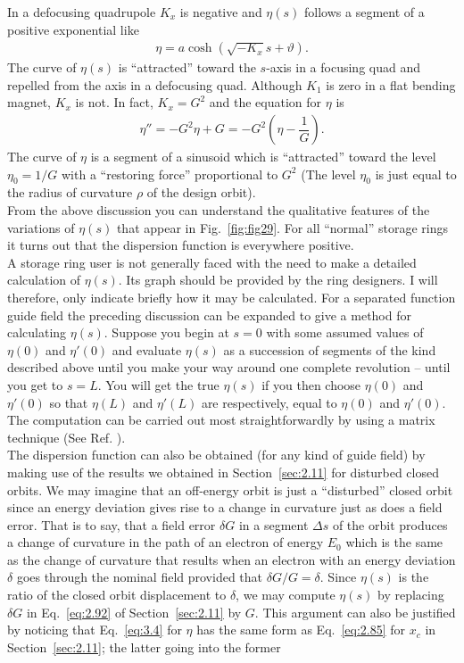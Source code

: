 In a defocusing quadrupole $K_x$ is negative and $\eta(s)$ follows a segment of a positive
exponential like
\begin{align*}
	\eta = a \cosh(\sqrt{-K_x}s+\vartheta).
\end{align*}
The curve of $\eta(s)$ is ``attracted'' toward the $s$-axis in a focusing quad and repelled
from the axis in a defocusing quad.
Although $K_1$ is zero in a flat bending magnet, $K_x$ is not. In fact, $K_x = G^2$ and
the equation for $\eta$ is
\begin{align}
	\eta'' = -G^2\eta + G = -G^2\left( \eta - \dfrac{1}{G} \right).
\end{align}
The curve of $\eta$ is a segment of a sinusoid which is ``attracted'' toward the level
$\eta_0 = 1/G$ with a ``restoring force'' proportional to $G^2$ (The level $\eta_0$ is just equal
to the radius of curvature $\rho$ of the design orbit).\\
From the above discussion you can understand the qualitative features of the variations
 of $\eta(s)$ that appear in Fig.~\ref{fig:fig29}. For all ``normal'' storage rings it turns
out that the dispersion function is everywhere positive.\\
A storage ring user is not generally faced with the need to make a detailed calculation of $\eta(s)$. Its graph should be provided by the ring designers. I will therefore, only indicate briefly how it may be calculated. For a separated function guide field the preceding discussion can be expanded to give a method for calculating $\eta(s)$. Suppose you begin at $s = 0$ with some assumed values of $\eta(0)$ and $\eta'(0)$ and evaluate $\eta(s)$ as a succession of segments of the kind described above until you make your way around one complete revolution -- until you get to $s = L$. You will get the true $\eta(s)$ if you then choose $\eta(0)$ and $\eta'(0)$ so that $\eta(L)$ and $\eta'(L)$ are respectively, equal to $\eta(0)$ and $\eta'(0)$. The computation can be carried out most straightforwardly by using a matrix technique (See Ref. \cite{11}).\\
The dispersion function can also be obtained (for any kind of guide field) by making use of the results we obtained in Section~\ref{sec:2.11} for disturbed closed orbits. We may imagine that an off-energy orbit is just a ``disturbed'' closed orbit since an energy deviation gives rise to a change in curvature just as does a field error. That is to say, that a field error $\delta G$ in a segment $\Delta s$ of the orbit produces a change of curvature in the path of an electron of energy $E_0$ which is the same as the change of curvature that results when an electron with an energy deviation $\delta$ goes through the nominal field provided that $\delta G/G = \delta$. Since $\eta(s)$ is the ratio of the closed orbit displacement to $\delta$, we may compute $\eta(s)$ by replacing $\delta G$ in Eq.~\eqref{eq:2.92} of Section~\ref{sec:2.11} by $G$. This argument can also be justified by noticing that Eq.~\eqref{eq:3.4} for $\eta$ has the same form as Eq.~\eqref{eq:2.85} for $x_c$ in Section~\ref{sec:2.11}; the latter going into the former
